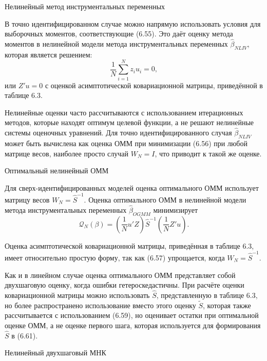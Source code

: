 \begin{center}
Нелинейный метод инструментальных переменных
\end{center}

В точно идентифицированном случае можно напрямую использовать условия для выборочных моментов, соответствующие (6.55). Это даёт оценку метода моментов в нелинейной
модели метода инструментальных переменных $\hat{\beta}_{NLIV}$, которая является решением:
\begin{equation}
\frac{1}{N} \sum_{i=1}^{N} z_i u_i=0,
\end{equation}
или $Z'u=0$ с оценкой асимптотической ковариационной матрицы, приведённой в таблице 6.3.

Нелинейные оценки часто рассчитываются с использованием итерационных методов, которые находят оптимум целевой функции, а не решают нелинейные системы оценочных уравнений. Для точно идентифицированного случая $\hat{\beta}_{NLIV}$ может быть вычислена как оценка ОММ при минимизации (6.56) при любой матрице весов, наиболее просто случай $W_N=I$, что приводит к
такой же оценке.

\begin{center}
Оптимальный нелинейный ОММ
\end{center}

Для сверх-идентифицированных моделей оценка оптимального ОММ использует матрицу весов $W_N={\hat{S}}^{-1}$. Оценка оптимального ОММ в нелинейной модели метода инструментальных переменных $\hat{\beta}_{OGMM}$ минимизирует
\begin{equation}
\mathcal{Q}_{N}(\beta)= \left( \frac{1}{N} u' Z \right) {\hat{S}}^{-1} \left( \frac{1}{N} Z' u \right).
\end{equation}

Оценка асимптотической ковариационной матрицы, приведённая в таблице 6.3, имеет относительно простую форму, так как (6.57) упрощается, когда $W_N={\hat{S}}^{-1}$.

Как и в линейном случае оценка оптимального ОММ представляет собой двухшаговую оценку, когда ошибки гетероскедастичны. При расчёте оценки ковариационной матрицы можно использовать $\hat{S}$, представленную в таблице 6.3, но более распространено использование вместо этого оценку $\tilde{S}$, которая также рассчитывается с использованием (6.59), но оценивает остатки при оптимальной оценке ОММ, а не оценке первого шага, которая используется для формирования $\hat{S}$ в (6.61).

\begin{center}
Нелинейный двухшаговый МНК
\end{center}

